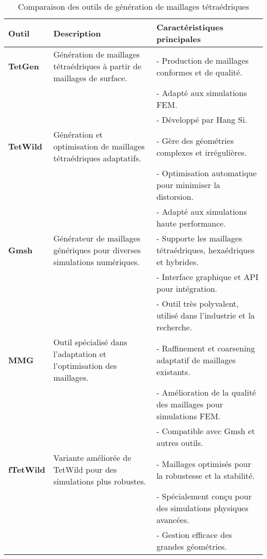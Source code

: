 \begin{table}[h]
    \centering
    \renewcommand{\arraystretch}{1.3}
    \begin{tabular}{|p{3cm}|p{5cm}|p{6cm}|}
        \hline
        \textbf{Outil} & \textbf{Description} & \textbf{Caractéristiques principales} \\ \hline
        \textbf{TetGen} & Génération de maillages tétraédriques à partir de maillages de surface. & - Production de maillages conformes et de qualité. \\
         & & - Adapté aux simulations FEM. \\
         & & - Développé par Hang Si. \\ \hline
        \textbf{TetWild} & Génération et optimisation de maillages tétraédriques adaptatifs. & - Gère des géométries complexes et irrégulières. \\
         & & - Optimisation automatique pour minimiser la distorsion. \\
         & & - Adapté aux simulations haute performance. \\ \hline
        \textbf{Gmsh} & Générateur de maillages génériques pour diverses simulations numériques. & - Supporte les maillages tétraédriques, hexaédriques et hybrides. \\
         & & - Interface graphique et API pour intégration. \\
         & & - Outil très polyvalent, utilisé dans l'industrie et la recherche. \\ \hline
        \textbf{MMG} & Outil spécialisé dans l'adaptation et l'optimisation des maillages. & - Raffinement et coarsening adaptatif de maillages existants. \\
         & & - Amélioration de la qualité des maillages pour simulations FEM. \\
         & & - Compatible avec Gmsh et autres outils. \\ \hline
        \textbf{fTetWild} & Variante améliorée de TetWild pour des simulations plus robustes. & - Maillages optimisés pour la robustesse et la stabilité. \\
         & & - Spécialement conçu pour des simulations physiques avancées. \\
         & & - Gestion efficace des grandes géométries. \\ \hline
    \end{tabular}
    \caption{Comparaison des outils de génération de maillages tétraédriques}
    \label{tab:maillage_tools}
\end{table}



